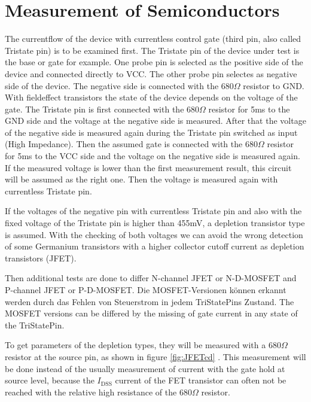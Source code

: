\section{Measurement of Semiconductors}
The currentflow of the device with currentless control gate (third pin, also called Tristate pin)
is to be examined first.
The Tristate pin of the device under test is the base or gate for example.
One probe pin is selected as the positive side of the device and connected directly to VCC.
The other probe pin  selectes as negative side of the device.
The negative side is connected with the \(680\Omega\) resistor to GND.
With fieldeffect transistors the state of the device depends on the voltage of the gate.
The Tristate pin is first connected with the \(680\Omega\) resistor for 5ms to the GND side and
the voltage at the negative side is measured.
After that the voltage of the negative side is measured again during the Tristate pin switched
as input (High Impedance).
Then the assumed gate is connected with the \(680\Omega\) resistor for 5ms to the VCC side and
the voltage on the negative side is measured again.
If the measured voltage is lower than the first measurement result, this circuit will
be assumed as the right one. Then the voltage is measured again with currentless Tristate pin.

If the voltages of the negative pin with currentless Tristate pin and also with the 
fixed voltage of the Tristate pin is higher than 455mV, a depletion transistor type is assumed.
With the checking of both voltages we can avoid the wrong detection of some Germanium transistors with a higher
collector cutoff current as depletion transistors (JFET).

Then additional tests are done 
to differ N-channel JFET or N-D-MOSFET and P-channel JFET or P-D-MOSFET.
Die MOSFET-Versionen können erkannt werden durch das Fehlen von Steuerstrom in jedem
TriStatePins Zustand.
The MOSFET versions can be differed by the missing of gate current in any state
of the TriStatePin.

To get parameters of the depletion types, they will be measured with a \(680 \Omega\) resistor at
the source pin, as shown in figure \ref{fig:JFETcd} . This measurement will be done instead of the
usually measurement of current with the gate hold at source level, because
the \(I_\mathrm{DSS}\) current of the FET transistor can often not be reached
with the relative high resistance of the \(680 \Omega\) resistor.

